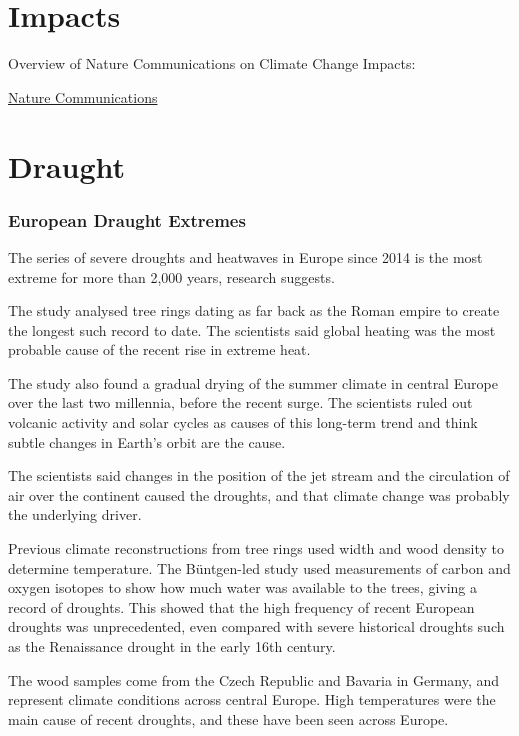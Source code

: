 \documentclass[
]{book}
\begin{document}
\hypertarget{impacts}{%
\chapter{Impacts}\label{impacts}}

Overview of Nature Communications on Climate Change Impacts:

\href{https://www.nature.com/collections/hcfhgcahdc}{Nature Communications}

\hypertarget{draught}{%
\chapter{Draught}\label{draught}}

\hypertarget{european-draught-extremes}{%
\subsection{European Draught Extremes}\label{european-draught-extremes}}

The series of severe droughts and heatwaves in Europe since 2014 is the most extreme for more than 2,000 years, research suggests.

The study analysed tree rings dating as far back as the Roman empire to create the longest such record to date. The scientists said global heating was the most probable cause of the recent rise in extreme heat.

The study also found a gradual drying of the summer climate in central Europe over the last two millennia, before the recent surge. The scientists ruled out volcanic activity and solar cycles as causes of this long-term trend and think subtle changes in Earth's orbit are the cause.

The scientists said changes in the position of the jet stream and the circulation of air over the continent caused the droughts, and that climate change was probably the underlying driver.

Previous climate reconstructions from tree rings used width and wood density to determine temperature. The Büntgen-led study used measurements of carbon and oxygen isotopes to show how much water was available to the trees, giving a record of droughts. This showed that the high frequency of recent European droughts was unprecedented, even compared with severe historical droughts such as the Renaissance drought in the early 16th century.

The wood samples come from the Czech Republic and Bavaria in Germany, and represent climate conditions across central Europe. High temperatures were the main cause of recent droughts, and these have been seen across Europe.
\end{document}
